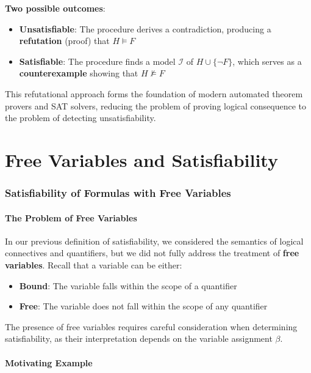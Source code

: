 \documentclass[11pt,a4paper]{article}
\theoremstyle{definition}
\theoremstyle{plain}
\theoremstyle{remark}
\begin{document}
\textbf{Two possible outcomes}:
\begin{itemize}
    \item \textbf{Unsatisfiable}: The procedure derives a contradiction, producing a \textbf{refutation} (proof) that $H \models F$
    \item \textbf{Satisfiable}: The procedure finds a model $\mathcal{I}$ of $H \cup \{\neg F\}$, which serves as a \textbf{counterexample} showing that $H \not\models F$
\end{itemize}

This refutational approach forms the foundation of modern automated theorem provers and SAT solvers, reducing the problem of proving logical consequence to the problem of detecting unsatisfiability.




\newpage

\part{Free Variables and Satisfiability}

\section{Satisfiability of Formulas with Free Variables}

\subsection{The Problem of Free Variables}

In our previous definition of satisfiability, we considered the semantics of logical connectives and quantifiers, but we did not fully address the treatment of \textbf{free variables}. Recall that a variable can be either:
\begin{itemize}
    \item \textbf{Bound}: The variable falls within the scope of a quantifier
    \item \textbf{Free}: The variable does not fall within the scope of any quantifier
\end{itemize}

The presence of free variables requires careful consideration when determining satisfiability, as their interpretation depends on the variable assignment $\beta$.

\subsection{Motivating Example}
\end{document}
